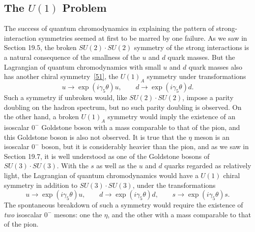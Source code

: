 \subsection{\texorpdfstring{The $U(1)$ Problem}{The U(1) Problem}}
\label{sec:19.10}

The success of quantum chromodynamics in explaining the pattern of strong-interaction symmetries seemed at first to be marred by one failure. As we saw in Section 19.5, the broken $SU(2)\cdot SU(2)$ symmetry of the strong interactions is a natural consequence of the smallness of the $u$ and $d$ quark masses. But the Lagrangian of quantum chromodynamics with small $u$ and $d$ quark masses also has another chiral symmetry~\hyperref[ch19-ref-51]{[51]}, the $U(1)_A$ symmetry under transformations
\begin{equation}
u\longrightarrow\exp(i\gamma_5\theta)u,
\qquad
d\longrightarrow\exp(i\gamma_5\theta)d.
\tag{19.10.1}\label{eq:19.10.1}
\end{equation}
Such a symmetry if unbroken would, like $SU(2)\cdot SU(2)$, impose a parity doubling on the hadron spectrum, but no such parity doubling is observed. On the other hand, a broken $U(1)_A$ symmetry would imply the existence of an isoscalar $0^-$ Goldstone boson with a mass comparable to that of the pion, and this Goldstone boson is also not observed. It is true that the $\eta$ meson is an isoscalar $0^-$ boson, but it is considerably heavier than the pion, and as we saw in Section 19.7, it is well understood as one of the Goldstone bosons of $SU(3)\cdot SU(3)$. With the $s$ as well as the $u$ and $d$ quarks regarded as relatively light, the Lagrangian of quantum chromodynamics would have a $U(1)$ chiral symmetry in addition to $SU(3)\cdot SU(3)$, under the transformations
\begin{equation}
u\longrightarrow\exp(i\gamma_5\theta)u,
\qquad
d\longrightarrow\exp(i\gamma_5\theta)d,
\qquad
s\longrightarrow\exp(i\gamma_5\theta)s.
\tag{19.10.2}\label{eq:19.10.2}
\end{equation}
The spontaneous breakdown of such a symmetry would require the existence of \emph{two} isoscalar $0^-$ mesons: one the $\eta$, and the other with a mass comparable to that of the pion.

